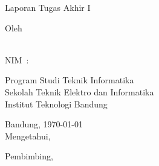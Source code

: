 
\begin{center}
  \smallskip
  \thispagestyle{empty}
  \Large \bfseries \MakeUppercase{\thetitle}
  \vfill

  \normalsize Laporan Tugas Akhir I
  \vfill

  \large Oleh
  
  \large \uppercase{\theauthor} \\
  \large NIM~:~\uppercase{\nim}

  \vfill

  \normalfont
  \normalsize Program Studi Teknik Informatika \\
  \normalsize Sekolah Teknik Elektro dan Informatika \\
  \normalsize Institut Teknologi Bandung \\
  \vfill

  \normalsize Bandung, \today \\
  \normalsize Mengetahui, \\
  \vfill

  Pembimbing,
  \vfill

  \uppercase{\supervisor{}} \\
  
\end{center}